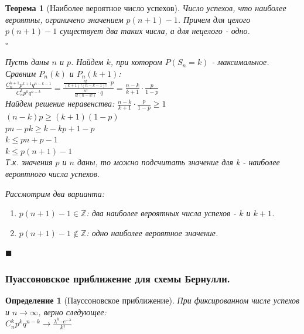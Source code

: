 \documentclass[14pt]{extarticle}
\theoremstyle{breakstyle}
\newtheorem{definition}{Определение}[subsection]
\newtheorem{theorem}{Теорема}[subsection]
\begin{document}
\begin{theorem}[Наиболее вероятное число успехов]

Число успехов, что наиболее вероятны, ограничено значением $p(n+1) - 1$. Причем для целого $p(n+1) - 1$ существует два таких числа, а для нецелого - одно. \\

$\square$

Пусть даны $n$ и $p$. Найдем $k$, при котором $P(S_{n} = k)$ - максимальное. \\
Сравним $P_{n}(k)$ и $P_{n}(k+1)$: \\

$\frac{C_{n}^{k+1}p^{k+1}q^{n-k-1}}{C_{n}^{k}p^{k}q^{n-k}} = \frac{\frac{n!}{(k+1)!(n-k-1)!} \cdot p}{\frac{n!}{k!(n-k!)} \cdot q} = \frac{n-k}{k+1} \cdot \frac{p}{1-p}$ \\
Найдем решение неравенства: $\frac{n-k}{k+1} \cdot \frac{p}{1-p} \geq 1$ \\
$(n-k)p \geq (k+1)(1-p)$ \\
$pn - pk \geq k - kp + 1 - p$ \\
$k \leq pn + p - 1$ \\
$k \leq p(n+1) - 1$ \\

Т.к. значения $p$ и $n$ даны, то можно подсчитать значение для k - наиболее вероятного числа успехов.

Рассмотрим два варианта:
\begin{enumerate}[noitemsep, topsep=0pt]
    \item $p(n+1) - 1 \in \mathbb{Z}$: два наиболее вероятных числа успехов - $k$ и $k+1$.
    \item $p(n+1) - 1 \notin \mathbb{Z}$: одно наиболее вероятное значение.
\end{enumerate}

\hfill$\blacksquare$

\end{theorem}

\subsubsection{Пуассоновское приближение для схемы Бернулли.}
\begin{definition}[Пауссоновское приближение]
При фиксированном числе успехов и $n \rightarrow \infty$, верно следующее: \\
$C_{n}^{k}p^{k}q^{n-k} \rightarrow \frac{\lambda^{k} \cdot e^{-\lambda}}{k!}$

\end{definition}
\end{document}
